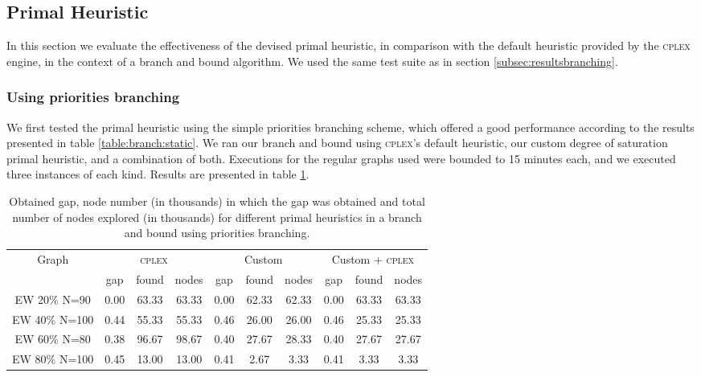 
\subsection{Primal Heuristic}
\label{subsec:resultsprimal}

In this section we evaluate the effectiveness of the devised primal heuristic, in comparison with the default heuristic provided by the \textsc{cplex} engine, in the context of a branch and bound algorithm. We used the same test suite as in section \ref{subsec:resultsbranching}.

\subsubsection{Using priorities branching}

We first tested the primal heuristic using the simple priorities branching scheme, which offered a good performance according to the results presented in table \ref{table:branch:static}. We ran our branch and bound using \textsc{cplex}'s default heuristic, our custom degree of saturation primal heuristic, and a combination of both. Executions for the regular graphs used were bounded to 15 minutes each, and we executed three instances of each kind. Results are presented in table \ref{table:primal:prios}.

\begin{table}[h]
\centering

\begin{tabular}{|c|ccc|ccc|ccc|}
\hline
\multicolumn{1}{|c|}{Graph} & \multicolumn{3}{|c|}{\textsc{cplex}} & \multicolumn{3}{|c|}{Custom} & \multicolumn{3}{|c|}{Custom + \textsc{cplex}}
\\
 & gap & found & nodes & gap & found & nodes & gap & found & nodes
\\
\hline
EW 20\% N=90 & 0.00 & 63.33 & 63.33 & 0.00 & 62.33 & 62.33 & 0.00 & 63.33 & 63.33
\\
EW 40\% N=100 & 0.44 & 55.33 & 55.33 & 0.46 & 26.00 & 26.00 & 0.46 & 25.33 & 25.33
\\
EW 60\% N=80 & 0.38 & 96.67 & 98.67 & 0.40 & 27.67 & 28.33 & 0.40 & 27.67 & 27.67
\\
EW 80\% N=100 & 0.45 & 13.00 & 13.00 & 0.41 & 2.67 & 3.33 & 0.41 & 3.33 & 3.33
\\
\hline 
 \end{tabular}
 
\caption{Obtained gap, node number (in thousands) in which the gap was obtained and total number of nodes explored (in thousands) for different primal heuristics in a branch and bound using priorities branching.}
\label{table:primal:prios}

\end{table}

